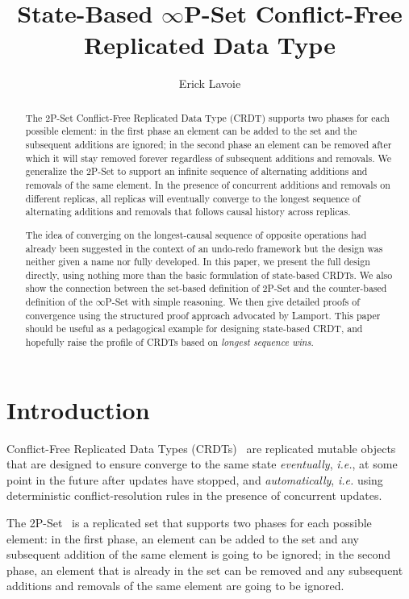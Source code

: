 \documentclass[11pt, oneside]{article}   	%
\title{State-Based $\infty$P-Set Conflict-Free Replicated Data Type}
\author{Erick Lavoie}
\begin{document}
\maketitle


\begin{abstract}
The 2P-Set Conflict-Free Replicated Data Type (CRDT) supports two phases for each possible element: in the first phase an element can be added to the set and the subsequent additions are ignored; in the second phase an element can be removed after which it will stay removed forever regardless of subsequent additions and removals. We generalize the 2P-Set to support an infinite sequence of alternating additions and removals of the same element. In the presence of concurrent additions and removals on different replicas, all replicas will eventually converge to the longest sequence of alternating additions and removals that follows causal history across replicas. 

The idea of converging on the longest-causal sequence of opposite operations had already been suggested in the context of an undo-redo framework but the design was neither given a name nor fully developed. In this paper, we present the full design directly, using nothing more than the basic formulation of state-based CRDTs. We also show the connection between the set-based definition of 2P-Set and the counter-based definition of the $\infty$P-Set with simple reasoning. We then give detailed proofs of convergence using the structured proof approach advocated by Lamport. This paper should be useful as a pedagogical example for designing state-based CRDT, and hopefully raise the profile of CRDTs based on \textit{longest sequence wins}.
\end{abstract}

\section{Introduction}

Conflict-Free Replicated Data Types (CRDTs)~\cite{shapiro:hal-00932836} are replicated mutable objects that are designed to ensure converge to the same state \textit{eventually}, \textit{i.e.}, at some point in the future after updates have stopped, and \textit{automatically}, \textit{i.e.} using deterministic conflict-resolution rules in the presence of concurrent updates. 

The 2P-Set~\cite{shapiro:inria-00555588} is a replicated set that supports two phases for each possible element: in the first phase, an element can be added to the set and any subsequent addition of the same element is going to be ignored; in the second phase, an element that is already in the set can be removed and any subsequent additions and removals of the same element are going to be ignored.
\end{document}
